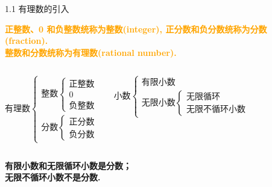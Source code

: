\begin{frame}{1.1 有理数的引入}
\begin{definition}
\textbf{\textcolor{orange}{正整数、0 和负整数统称为整数(integer), 正分数和负分数统称为分数(fraction).\\
整数和分数统称为有理数(rational number).}}
\end{definition}
\vspace{12pt}
\begin{columns}
\[
\mbox{有理数}\begin{cases}
\mbox{整数} \begin{cases}
    \mbox{正整数} \\
    0 \\
    \mbox{负整数}
    \end{cases} \\
\mbox{分数}  \begin{cases}
    \mbox{正分数} \\
    \mbox{负分数}
    \end{cases}
\end{cases}
\]

\[
\mbox{小数}\begin{cases}
\mbox{有限小数} \\
\mbox{无限小数} \begin{cases} 
\mbox{无限循环} \\
\mbox{无限不循环小数}
\end{cases}
\end{cases}
\]

\end{columns}
\vspace{12pt}
\textbf{有限小数和无限循环小数是分数；\\
无限不循环小数不是分数.}
\end{frame}
